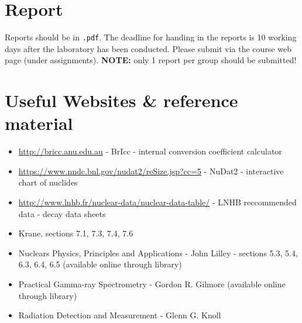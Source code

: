 \documentclass[12pt]{article}
\begin{document}
\section*{Report}
Reports should be in \texttt{.pdf}. The deadline for handing in the reports is 10 working days after the laboratory has been conducted.
Please submit via the course web page (under assignments).
{\bf NOTE:} only 1 report per group should be submitted!

\section*{Useful Websites \& reference material}
\begin{itemize}
    \item \href{http://bricc.anu.edu.au}{http://bricc.anu.edu.au} - BrIcc - internal conversion coefficient calculator
    \item \href{https://www.nndc.bnl.gov/nudat2/reSize.jsp?cc=5}{https://www.nndc.bnl.gov/nudat2/reSize.jsp?cc=5} - NuDat2 - interactive chart of nuclides
    \item \href{http://www.lnhb.fr/nuclear-data/nuclear-data-table}{http://www.lnhb.fr/nuclear-data/nuclear-data-table/} - LNHB reccommended data - decay data sheets
    \item Krane, sections 7.1, 7.3, 7.4, 7.6
    \item Nuclears Physics, Principles and Applications - John Lilley - sections 5.3, 5.4, 6.3, 6.4, 6.5 (available online through library)
    \item Practical Gamma-ray Spectrometry - Gordon R. Gilmore (available online through library)
    \item Radiation Detection and Measurement - Glenn G. Knoll
\end{itemize}
\end{document}
